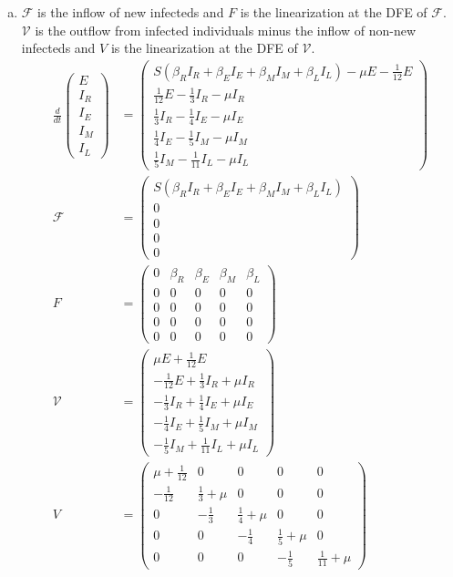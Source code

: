 \documentclass[12pt]{article}\usepackage[]{graphicx}\usepackage[]{color}
\begin{document}
\begin{enumerate}[(a)]
\item 
$ \mathcal{F}$ is the inflow of new infecteds and $F$ is the linearization at the DFE of $\mathcal{F}$.  $ \mathcal{V}$ is the outflow from infected individuals minus the inflow of non-new infecteds and $V$ is the linearization at the DFE of $\mathcal{V}$. 
\begin{align*}
\frac{d}{dt} \begin{pmatrix}
E \\
I_R \\
I_E \\
I_M \\
I_L
\end{pmatrix} &= \begin{pmatrix}
S (\beta_R I _R + \beta_E I _E + \beta_M I_M + \beta_L I_L) - \mu E - \frac{1}{12} E \\
\frac{1}{12} E - \frac{1}{3} I_R - \mu I_R\\
\frac{1}{3} I_R - \frac{1}{4} I_E - \mu I_E \\
\frac{1}{4} I_E - \frac{1}{5} I_M - \mu I_M \\
\frac{1}{5} I_M - \frac{1}{11} I_L - \mu I_L
\end{pmatrix} \\
\mathcal{F} &= \begin{pmatrix}
S (\beta_R I _R + \beta_E I _E + \beta_M I_M + \beta_L I_L) \\
0\\
0 \\
0 \\
0
\end{pmatrix} \\
F &= \begin{pmatrix}
0 & \beta_R & \beta_E & \beta_M & \beta_L \\
0 & 0 & 0 & 0 & 0\\
0 & 0 & 0 & 0 & 0\\
0 & 0 & 0 & 0 & 0\\
0 & 0 & 0 & 0 & 0
\end{pmatrix}  \\
\mathcal{V} &= \begin{pmatrix}
\mu E + \frac{1}{12} E \\
- \frac{1}{12} E + \frac{1}{3} I_R + \mu I_R\\
- \frac{1}{3} I_R + \frac{1}{4} I_E + \mu I_E \\
- \frac{1}{4} I_E + \frac{1}{5} I_M + \mu I_M \\
- \frac{1}{5} I_M + \frac{1}{11} I_L + \mu I_L
\end{pmatrix}  \\
V &= \begin{pmatrix}
\mu + \frac{1}{12} & 0 & 0 & 0 & 0\\
- \frac{1}{12} & \frac{1}{3} + \mu & 0 & 0 &0 \\
0 & - \frac{1}{3} & \frac{1}{4} + \mu & 0 & 0 \\
0 & 0 & - \frac{1}{4} & \frac{1}{5} + \mu & 0 \\
0 & 0 & 0 & - \frac{1}{5} & \frac{1}{11} + \mu
\end{pmatrix} \\
\end{align*}


\end{enumerate}
\end{document}
